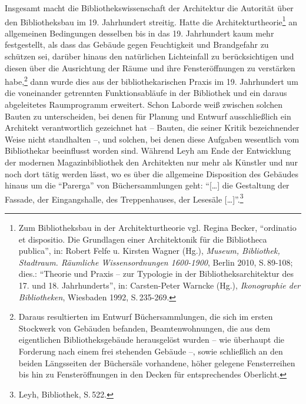 Insgesamt macht die Bibliothekswissenschaft der Architektur die
Autorität über den Bibliotheksbau im 19. Jahrhundert streitig. Hatte die
Architekturtheorie\footnote{Zum Bibliotheksbau in der Architekturtheorie
  vgl. Regina Becker, \enquote{ordinatio et dispositio. Die Grundlagen
  einer Architektonik für die Bibliotheca publica}, in: Robert Felfe u.
  Kirsten Wagner (Hg.), \emph{Museum, Bibliothek, Stadtraum. Räumliche
  Wissensordnungen 1600-1900}, Berlin 2010, S.\,89-108; dies.:
  \enquote{Theorie und Praxis -- zur Typologie in der
  Bibliotheksarchitektur des 17. und 18. Jahrhunderts}, in:
  Carsten-Peter Warncke (Hg.), \emph{Ikonographie der Bibliotheken},
  Wiesbaden 1992, S.\,235-269.} an allgemeinen Bedingungen desselben bis
in das 19. Jahrhundert kaum mehr festgestellt, als dass das Gebäude
gegen Feuchtigkeit und Brandgefahr zu schützen sei, darüber hinaus den
natürlichen Lichteinfall zu berücksichtigen und diesen über die
Ausrichtung der Räume und ihre Fensteröffnungen zu verstärken
habe,\footnote{Daraus resultierten im Entwurf Büchersammlungen, die sich
  im ersten Stockwerk von Gebäuden befanden, Beamtenwohnungen, die aus
  dem eigentlichen Bibliotheksgebäude herausgelöst wurden -- wie
  überhaupt die Forderung nach einem frei stehenden Gebäude --, sowie
  schließlich an den beiden Längsseiten der Büchersäle vorhandene, höher
  gelegene Fensterreihen bis hin zu Fensteröffnungen in den Decken für
  entsprechendes Oberlicht.} dann wurde dies aus der bibliothekarischen
Praxis im 19. Jahrhundert um die voneinander getrennten Funktionsabläufe
in der Bibliothek und ein daraus abgeleitetes Raumprogramm erweitert.
Schon Laborde weiß zwischen solchen Bauten zu unterscheiden, bei denen
für Planung und Entwurf ausschließlich ein Architekt verantwortlich
gezeichnet hat -- Bauten, die seiner Kritik bezeichnender Weise nicht
standhalten --, und solchen, bei denen diese Aufgaben wesentlich vom
Bibliothekar beeinflusst worden sind. Während Leyh am Ende der
Entwicklung der modernen Magazinbibliothek den Architekten nur mehr als
Künstler und nur noch dort tätig werden lässt, wo es über die allgemeine
Disposition des Gebäudes hinaus um die \enquote{Parerga} von
Büchersammlungen geht: \enquote{{[}\ldots{}{]} die Gestaltung der
Fassade, der Eingangshalle, des Treppenhauses, der Lesesäle
{[}\ldots{}{]}}.\footnote{Leyh, Bibliothek, S.\,522.}

